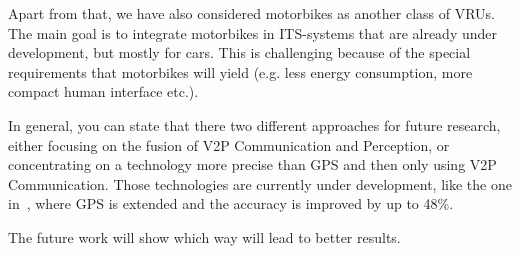 \documentclass[]{ccs-thesis}
\begin{document}
Apart from that, we have also considered motorbikes as another class of \acp{VRU}. The main goal is to integrate motorbikes in \ac{ITS}-systems that are already under development, but mostly for cars. This is challenging because of the special requirements that motorbikes will yield (e.g. less energy consumption, more compact human interface etc.).

In general, you can state that there two different approaches for future research, either focusing on the fusion of V2P Communication and Perception, or concentrating on a technology more precise than GPS and then only using V2P Communication. Those technologies are currently under development, like the one in~\cite{doppler}, where GPS is extended and the accuracy is improved by up to 48\%. 

The future work will show which way will lead to better results.



\cleardoublepage

\listofabbreviations
\clearpage

\listoffigures
\clearpage

\end{document}
